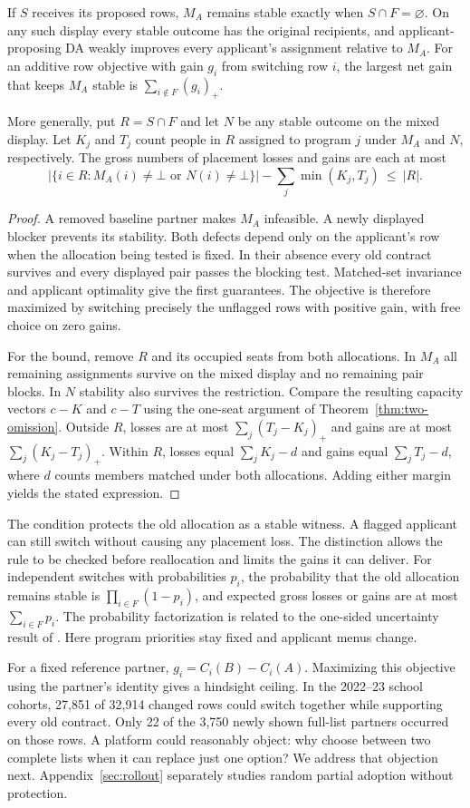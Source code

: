\begin{theorem}\label{thm:two-policy-screen}
If $S$ receives its proposed rows, $M_A$ remains stable exactly when $S\cap F=\varnothing$. On any such display every stable outcome has the original recipients, and applicant-proposing DA weakly improves every applicant's assignment relative to $M_A$. For an additive row objective with gain $g_i$ from switching row $i$, the largest net gain that keeps $M_A$ stable is $\sum_{i\notin F}(g_i)_+$.

More generally, put $R=S\cap F$ and let $N$ be any stable outcome on the mixed display. Let $K_j$ and $T_j$ count people in $R$ assigned to program $j$ under $M_A$ and $N$, respectively. The gross numbers of placement losses and gains are each at most
\[
 \bigl|\{i\in R: M_A(i)\ne\bot\text{ or }N(i)\ne\bot\}\bigr|-\sum_j\min(K_j,T_j)\ \leq\ |R|.
\]
\end{theorem}
\begin{proof}
A removed baseline partner makes $M_A$ infeasible. A newly displayed blocker prevents its stability. Both defects depend only on the applicant's row when the allocation being tested is fixed. In their absence every old contract survives and every displayed pair passes the blocking test. Matched-set invariance and applicant optimality give the first guarantees. The objective is therefore maximized by switching precisely the unflagged rows with positive gain, with free choice on zero gains.

For the bound, remove $R$ and its occupied seats from both allocations. In $M_A$ all remaining assignments survive on the mixed display and no remaining pair blocks. In $N$ stability also survives the restriction. Compare the resulting capacity vectors $c-K$ and $c-T$ using the one-seat argument of Theorem~\ref{thm:two-omission}. Outside $R$, losses are at most $\sum_j(T_j-K_j)_+$ and gains are at most $\sum_j(K_j-T_j)_+$. Within $R$, losses equal $\sum_j K_j-d$ and gains equal $\sum_j T_j-d$, where $d$ counts members matched under both allocations. Adding either margin yields the stated expression.
\end{proof}
The condition protects the old allocation as a stable witness. A flagged applicant can still switch without causing any placement loss. The distinction allows the rule to be checked before reallocation and limits the gains it can deliver. For independent switches with probabilities $p_i$, the probability that the old allocation remains stable is $\prod_{i\in F}(1-p_i)$, and expected gross losses or gains are at most $\sum_{i\in F}p_i$. The probability factorization is related to the one-sided uncertainty result of \citet{aziz_uncertain}. Here program priorities stay fixed and applicant menus change.

For a fixed reference partner, $g_i=C_i(B)-C_i(A)$. Maximizing this objective using the partner's identity gives a hindsight ceiling. In the 2022--23 school cohorts, 27,851 of 32,914 changed rows could switch together while supporting every old contract. Only 22 of the 3,750 newly shown full-list partners occurred on those rows. A platform could reasonably object: why choose between two complete lists when it can replace just one option? We address that objection next. Appendix~\ref{sec:rollout} separately studies random partial adoption without protection.

